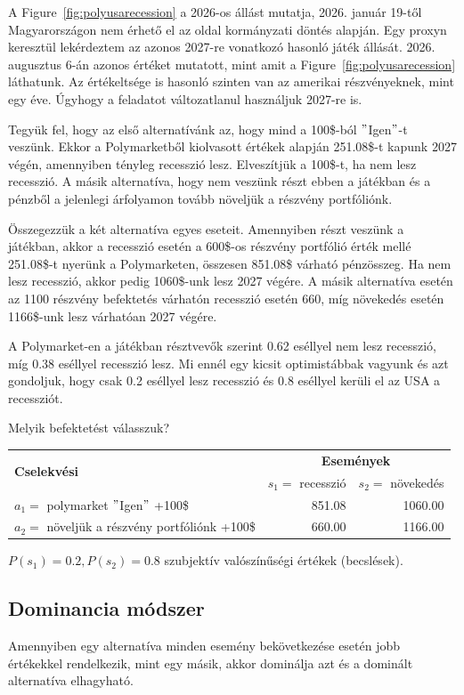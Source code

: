 \documentclass[a4paper,12pt]{article}
\begin{document}
A Figure~\ref{fig:polyusarecession} a 2026-os állást mutatja, 2026. január 19-től Magyarországon nem érhető
el az oldal kormányzati döntés alapján.
Egy proxyn keresztül lekérdeztem az azonos 2027-re vonatkozó hasonló játék állását.
2026. augusztus 6-án azonos értéket mutatott, mint amit a Figure~\ref{fig:polyusarecession} láthatunk.
Az értékeltsége is hasonló szinten van az amerikai részvényeknek, mint egy éve.
Úgyhogy a feladatot változatlanul használjuk 2027-re is.

Tegyük fel, hogy az első alternatívánk az, hogy mind a 100\$-ból \("\)Igen\("\)-t veszünk.
Ekkor a Polymarketből kiolvasott értékek alapján 251.08\$-t kapunk 2027 végén, amennyiben tényleg recesszió lesz.
Elveszítjük a 100\$-t, ha nem lesz recesszió.
A másik alternatíva, hogy nem veszünk részt ebben a játékban
és a pénzből a jelenlegi árfolyamon tovább növeljük a részvény portfóliónk.

Összegezzük a két alternatíva egyes eseteit.
Amennyiben részt veszünk a játékban, akkor a recesszió esetén
a 600\$-os részvény portfólió érték mellé 251.08\$-t nyerünk a Polymarketen, összesen 851.08\$ várható pénzösszeg.
Ha nem lesz recesszió, akkor pedig 1060\$-unk lesz 2027 végére.
A másik alternatíva esetén az 1100 részvény befektetés várhatón recesszió esetén 660,
míg növekedés esetén 1166\$-unk lesz várhatóan 2027 végére.

A Polymarket-en a játékban résztvevők szerint 0.62 eséllyel nem lesz recesszió, míg 0.38 eséllyel recesszió lesz.
Mi ennél egy kicsit optimistábbak vagyunk és azt gondoljuk, hogy csak 0.2 eséllyel lesz recesszió
és 0.8 eséllyel kerüli el az USA a recessziót.

Melyik befektetést válasszuk?

\begin{center}
\begin{tabular}{l|r|r}
\multirow{2}{*}{\bf Cselekvési} &  \multicolumn{2}{c}{ \bf Események }\\
 {\bf lehetőségek} & $s_1=$ recesszió & $s_2=$ növekedés \\
\hline
  $a_1=$ polymarket \("\)Igen\("\) +100\$ & 851.08 & 1060.00 \\
  $a_2=$ növeljük a részvény portfóliónk +100\$ & 660.00 & 1166.00 \\
\end{tabular}
\end{center}
$P(s_1) = 0.2 , P(s_2) = 0.8$ szubjektív valószínűségi értékek (becslések).

\subsection{Dominancia módszer}
\label{susec:domi}
Amennyiben egy alternatíva minden esemény bekövetkezése esetén jobb értékekkel rendelkezik, mint egy másik, akkor dominálja azt és a dominált alternatíva elhagyható.
\end{document}
